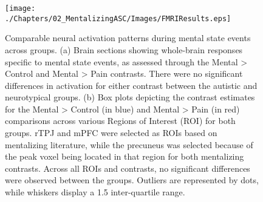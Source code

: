 \begin{figure}[!ht]
	\centering
    \texttt{[image: ./Chapters/02\_MentalizingASC/Images/FMRIResults.eps]}
	\caption{Comparable neural activation patterns during mental state events across groups. (a) Brain sections showing whole-brain responses specific to mental state events, as assessed through the Mental > Control and Mental > Pain contrasts. There were no significant differences in activation for either contrast between the autistic and neurotypical groups. (b) Box plots depicting the contrast estimates for the Mental > Control (in blue) and Mental > Pain (in red) comparisons across various Regions of Interest (ROI) for both groups. rTPJ and mPFC were selected as ROIs based on mentalizing literature, while the precuneus was selected because of the peak voxel being located in that region for both mentalizing contrasts. Across all ROIs and contrasts, no significant differences were observed between the groups. Outliers are represented by dots, while whiskers display a 1.5 inter-quartile range.}
    \vspace*{-10pt}
	\label{fig:fmri-results}
\end{figure}



